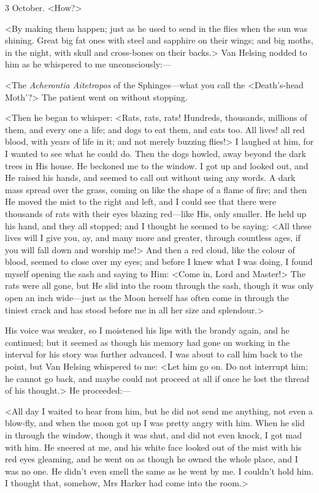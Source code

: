 \begin{diary}{3 October.}
<How?>

<By making them happen; just as he used to send in the flies when the sun was shining. Great big fat ones with steel and sapphire on their wings; and big moths, in the night, with skull and cross-bones on their backs.> Van Helsing nodded to him as he whispered to me unconsciously:—

<The \textit{Acherontia Aitetropos} of the Sphinges—what you call the <Death's-head Moth'?> The patient went on without stopping.

<Then he began to whisper: <Rats, rats, rats! Hundreds, thousands, millions of them, and every one a life; and dogs to eat them, and cats too. All lives! all red blood, with years of life in it; and not merely buzzing flies!> I laughed at him, for I wanted to see what he could do. Then the dogs howled, away beyond the dark trees in His house. He beckoned me to the window. I got up and looked out, and He raised his hands, and seemed to call out without using any words. A dark mass spread over the grass, coming on like the shape of a flame of fire; and then He moved the mist to the right and left, and I could see that there were thousands of rats with their eyes blazing red—like His, only smaller. He held up his hand, and they all stopped; and I thought he seemed to be saying: <All these lives will I give you, ay, and many more and greater, through countless ages, if you will fall down and worship me!> And then a red cloud, like the colour of blood, seemed to close over my eyes; and before I knew what I was doing, I found myself opening the sash and saying to Him: <Come in, Lord and Master!> The rats were all gone, but He slid into the room through the sash, though it was only open an inch wide—just as the Moon herself has often come in through the tiniest crack and has stood before me in all her size and splendour.>

His voice was weaker, so I moistened his lips with the brandy again, and he continued; but it seemed as though his memory had gone on working in the interval for his story was further advanced. I was about to call him back to the point, but Van Helsing whispered to me: <Let him go on. Do not interrupt him; he cannot go back, and maybe could not proceed at all if once he lost the thread of his thought.> He proceeded:—

<All day I waited to hear from him, but he did not send me anything, not even a blow-fly, and when the moon got up I was pretty angry with him. When he slid in through the window, though it was shut, and did not even knock, I got mad with him. He sneered at me, and his white face looked out of the mist with his red eyes gleaming, and he went on as though he owned the whole place, and I was no one. He didn't even smell the same as he went by me. I couldn't hold him. I thought that, somehow, Mrs Harker had come into the room.>


\end{diary}
